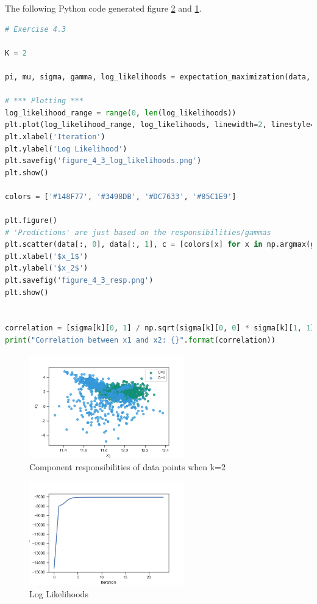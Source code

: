 \documentclass[a4paper]{article}
\begin{document}
The following Python code generated figure \ref{Fig:4_3_log_likelihoods} and \ref{Fig:4_3_responsibilities}.

\begin{lstlisting}[language=Python]
# Exercise 4.3

K = 2

pi, mu, sigma, gamma, log_likelihoods = expectation_maximization(data, K, early_stopping=True)

# *** Plotting ***
log_likelihood_range = range(0, len(log_likelihoods))
plt.plot(log_likelihood_range, log_likelihoods, linewidth=2, linestyle="-")
plt.xlabel('Iteration')
plt.ylabel('Log Likelihood')
plt.savefig('figure_4_3_log_likelihoods.png')
plt.show()
    
colors = ['#148F77', '#3498DB', '#DC7633', '#85C1E9']

plt.figure()
# 'Predictions' are just based on the responsibilities/gammas
plt.scatter(data[:, 0], data[:, 1], c = [colors[x] for x in np.argmax(gamma, 1)], alpha = 0.75)
plt.xlabel('$x_1$')
plt.ylabel('$x_2$')
plt.savefig('figure_4_3_resp.png')
plt.show()


correlation = [sigma[k][0, 1] / np.sqrt(sigma[k][0, 0] * sigma[k][1, 1]) for k in range(0, K)]
print("Correlation between x1 and x2: {}".format(correlation))
\end{lstlisting}

\begin{figure}[H]
\center
\includegraphics[width=0.6\textwidth]{Images/figure_4_3_resp.png}
\caption{Component responsibilities of data points when k=2}
\label{Fig:4_3_responsibilities}
\end{figure}

\begin{figure}[H]
\center
\includegraphics[width=0.6\textwidth]{Images/figure_4_3_log_likelihoods.png}
\caption{Log Likelihoods}
\label{Fig:4_3_log_likelihoods}
\end{figure}
\end{document}

